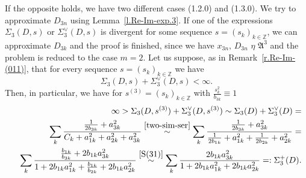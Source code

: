 \documentclass[preprint,12pt]{elsarticle}
\numberwithin{equation}{section}
\begin{document}
If the opposite holds, 
we have two different cases (1.2.0) and (1.3.0).
We try
to approximate $D_{3n}$  using Lemma~\ref{l.Re-Im-exp.3}. If one of the expressions  $\Sigma_3(D,s)$ or $\Sigma^{\vee}_3(D,s)$ is divergent
for some sequence $s=(s_k)_{k\in \mathbb Z}$,
we can approximate $D_{3k}$ and the proof is finished,  since we have  $x_{3n},\,D_{3n}\,\,\eta\,\, {\mathfrak A}^3$ 
and the problem is reduced to the case $m=2$. 
Let us suppose,  as in Remark~\ref{r.Re-Im-(011)}, that for every sequence $s=(s_k)_{k\in \mathbb Z}$ we have
$$
\Sigma_3(D,s)+\Sigma^{\vee}_3(D,s)<\infty.
$$
%
Then, in particular, we have for $s^{(3)}=(s_{k})_{k\in \mathbb Z}$
with $\frac{s^2_{k}}{b_{3k}}\equiv 1$
\begin{eqnarray*}
&& 
 \infty> \Sigma_3(D,s^{(3)})+\Sigma^{\vee}_3(D,s^{(3)})\sim \Sigma_3(D)+\Sigma^{\vee}_3(D)=\\
&&
\sum_k\frac{\frac{1}{2b_{3k}}+a^2_{3k}}{C_k+a^2_{1k}+a^2_{2k}+a^2_{3k}}\stackrel{\eqref{two-sim-ser}}{\sim}
\sum_k\frac{
\frac{1}{2b_{3k}}+a^2_{3k}}{\frac{1}{2b_{1k}}+a^2_{1k}+
\frac{1}{2b_{2k}}+a^2_{2k}}=\\
&&
 \sum_k\frac{\frac{b_{1k}}{b_{3k}}+2b_{1k}a^2_{3k}}{1+2b_{1k}a^2_{1k}+\frac{b_{1k}}{b_{2k}}+2b_{1k}a^2_{2k}}\stackrel{\eqref{S(31)}}{\sim}
\sum_k\frac{2b_{1k}a^2_{3k}
}
{1+2b_{1k}a^2_{1k}+2b_{1k}a^2_{2k}}=:\Sigma^+_3(D).
\end{eqnarray*}
%
\end{document}

